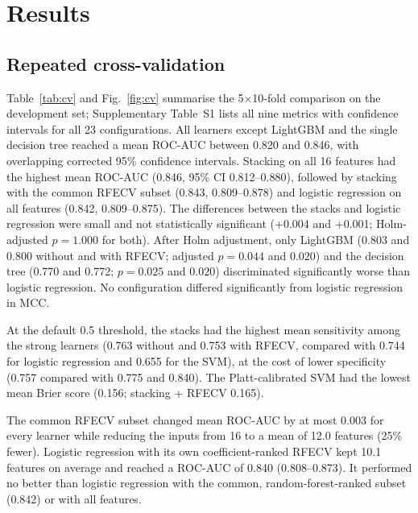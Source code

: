 \section{Results}
\label{sec:results}

\subsection{Repeated cross-validation}
Table~\ref{tab:cv} and Fig.~\ref{fig:cv} summarise the 5$\times$10-fold comparison on the development set; Supplementary Table~S1 lists all nine metrics with confidence intervals for all 23 configurations. All learners except LightGBM and the single decision tree reached a mean ROC-AUC between 0.820 and 0.846, with overlapping corrected 95\% confidence intervals. Stacking on all 16 features had the highest mean ROC-AUC (0.846, 95\% CI 0.812--0.880), followed by stacking with the common RFECV subset (0.843, 0.809--0.878) and logistic regression on all features (0.842, 0.809--0.875). The differences between the stacks and logistic regression were small and not statistically significant (+0.004 and +0.001; Holm-adjusted $p = 1.000$ for both). After Holm adjustment, only LightGBM (0.803 and 0.800 without and with RFECV; adjusted $p = 0.044$ and $0.020$) and the decision tree (0.770 and 0.772; $p = 0.025$ and $0.020$) discriminated significantly worse than logistic regression. No configuration differed significantly from logistic regression in MCC.

At the default 0.5 threshold, the stacks had the highest mean sensitivity among the strong learners (0.763 without and 0.753 with RFECV, compared with 0.744 for logistic regression and 0.655 for the SVM), at the cost of lower specificity (0.757 compared with 0.775 and 0.840). The Platt-calibrated SVM had the lowest mean Brier score (0.156; stacking + RFECV 0.165).

The common RFECV subset changed mean ROC-AUC by at most 0.003 for every learner while reducing the inputs from 16 to a mean of 12.0 features (25\% fewer). Logistic regression with its own coefficient-ranked RFECV kept 10.1 features on average and reached a ROC-AUC of 0.840 (0.808--0.873). It performed no better than logistic regression with the common, random-forest-ranked subset (0.842) or with all features.

